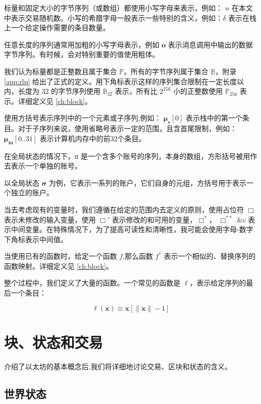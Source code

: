 \documentclass[9pt,oneside]{amsart}
\begin{document}
\begin{multicols}{2}
标量和固定大小的字节序列（或数组）都使用小写字母来表示，例如： $n$ 在本文中表示交易随机数。小写的希腊字母一般表示一些特别的含义，例如：$\delta$ 表示在栈上一个给定操作需要的条目数量。

任意长度的序列通常用加粗的小写字母表示，例如 $\mathbf{o}$ 表示消息调用中输出的数据字节序列。有时候，会对特别重要的值使用粗体。

我们认为标量都是正整数且属于集合 $\mathbb{P}$。所有的字节序列属于集合 $\mathbb{B}$，附录 \ref{app:rlp} 给出了正式的定义。用下角标表示这样的序列集合限制在一定长度以内，长度为 32 的字节序列使用 $\mathbb{B}_{32}$ 表示，所有比 $2^{256}$ 小的正整数使用 $\mathbb{P}_{256}$ 表示。详细定义见 \ref{ch:block}。

使用方括号表示序列中的一个元素或子序列,例如： $\boldsymbol{\mu}_\mathbf{s}[0]$ 表示栈中的第一个条目。对于子序列来说，使用省略号表示一定的范围，且含首尾限制，例如：$\boldsymbol{\mu}_\mathbf{m}[0..31]$ 表示计算机内存中的前32个条目。

在全局状态的情况下，σ 是一个含多个账号的序列，本身的数组，方形括号被用作去表示一个单独的账号。

以全局状态 $\boldsymbol{\sigma}$ 为例，它表示一系列的账户，它们自身的元组，方括号用于表示一个独立的账户。

当去考虑现有的变量时，我们遵循在给定的范围内去定义的原则，使用占位符 $\Box$ 表示未修改的输入变量，使用 $\Box'$ 表示修改的和可用的变量，$\Box^*$， $\Box^{**}$ \&c 表示中间变量。在特殊情况下，为了提高可读性和清晰性，我可能会使用字母-数字下角标表示中间值。

当使用已有的函数时，给定一个函数 $f$,那么函数 $f^*$ 表示一个相似的、替换序列的函数映射。详细定义见 \ref{ch:block}。

整个过程中，我们定义了大量的函数。一个常见的函数是 $\ell$，表示给定序列的最后一个条目：


\begin{equation}
\ell(\mathbf{x}) \equiv \mathbf{x}[\lVert \mathbf{x} \rVert - 1]
\end{equation}


\section{块、状态和交易} \label{ch:bst}

介绍了以太坊的基本概念后,我们将详细地讨论交易、区块和状态的含义。

\subsection{世界状态} \label{ch:state}



\end{multicols}
\end{document}
